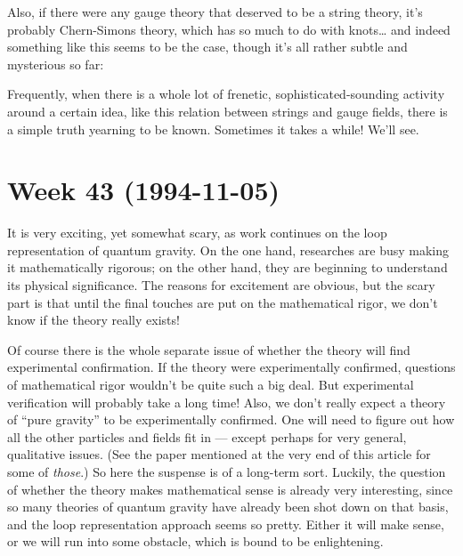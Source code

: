 \documentclass{article}
\def\tightlist{}
\renewcommand{\texttt}[1]{%
  \begingroup
  \ttfamily
  \begingroup\lccode`~=`/\lowercase{\endgroup\def~}{/\discretionary{}{}{}}%
  \begingroup\lccode`~=`[\lowercase{\endgroup\def~}{[\discretionary{}{}{}}%
  \begingroup\lccode`~=`.\lowercase{\endgroup\def~}{.\discretionary{}{}{}}%
  \catcode`/=\active\catcode`[=\active\catcode`.=\active
  \scantokens{#1\noexpand}%
  \endgroup
}
\begin{document}
Also, if there were any gauge theory that deserved to be a string
theory, it's probably Chern-Simons theory, which has so much to do with
knots\ldots{} and indeed something like this seems to be the case,
though it's all rather subtle and mysterious so far:


Frequently, when there is a whole lot of frenetic,
sophisticated-sounding activity around a certain idea, like this
relation between strings and gauge fields, there is a simple truth
yearning to be known. Sometimes it takes a while! We'll see.
\hypertarget{week43}{%
\section{Week 43 (1994-11-05)}\label{week43}}

It is very exciting, yet somewhat scary, as work continues on the loop
representation of quantum gravity. On the one hand, researches are busy
making it mathematically rigorous; on the other hand, they are beginning
to understand its physical significance. The reasons for excitement are
obvious, but the scary part is that until the final touches are put on
the mathematical rigor, we don't know if the theory really exists!

Of course there is the whole separate issue of whether the theory will
find experimental confirmation. If the theory were experimentally
confirmed, questions of mathematical rigor wouldn't be quite such a big
deal. But experimental verification will probably take a long time!
Also, we don't really expect a theory of ``pure gravity'' to be
experimentally confirmed. One will need to figure out how all the other
particles and fields fit in --- except perhaps for very general,
qualitative issues. (See the paper mentioned at the very end of this
article for some of \emph{those}.) So here the suspense is of a
long-term sort. Luckily, the question of whether the theory makes
mathematical sense is already very interesting, since so many theories
of quantum gravity have already been shot down on that basis, and the
loop representation approach seems so pretty. Either it will make sense,
or we will run into some obstacle, which is bound to be enlightening.
\end{document}
